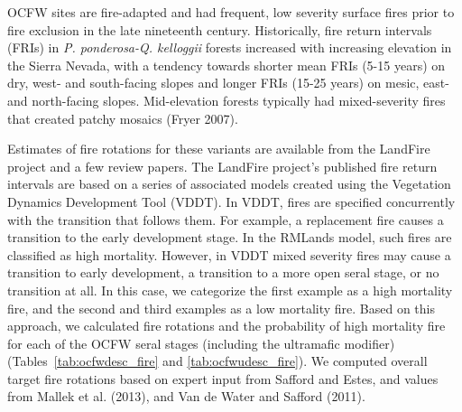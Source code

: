 OCFW sites are fire-adapted and had frequent, low severity surface fires prior to fire exclusion in the late nineteenth century. Historically, fire return intervals (FRIs) in \emph{P. ponderosa-Q. kelloggii} forests increased with increasing elevation in the Sierra Nevada, with a tendency towards shorter mean FRIs (5-15 years) on dry, west- and south-facing slopes and longer FRIs (15-25 years) on mesic, east- and north-facing slopes. Mid-elevation forests typically had mixed-severity fires that created patchy mosaics (Fryer 2007).

Estimates of fire rotations for these variants are available from the LandFire project and a few review papers. The LandFire project’s published fire return intervals are based on a series of associated models created using the Vegetation Dynamics Development Tool (VDDT). In VDDT, fires are specified concurrently with the transition that follows them. For example, a replacement fire causes a transition to the early development stage. In the RMLands model, such fires are classified as high mortality. However, in VDDT mixed severity fires may cause a transition to early development, a transition to a more open seral stage, or no transition at all. In this case, we categorize the first example as a high mortality fire, and the second and third examples as a low mortality fire. Based on this approach, we calculated fire rotations and the probability of high mortality fire for each of the OCFW seral stages (including the ultramafic modifier) (Tables~\ref{tab:ocfwdesc_fire} and \ref{tab:ocfwudesc_fire}). We computed overall target fire rotations based on expert input from Safford and Estes, and values from Mallek et al. (2013), and Van de Water and Safford (2011). 




